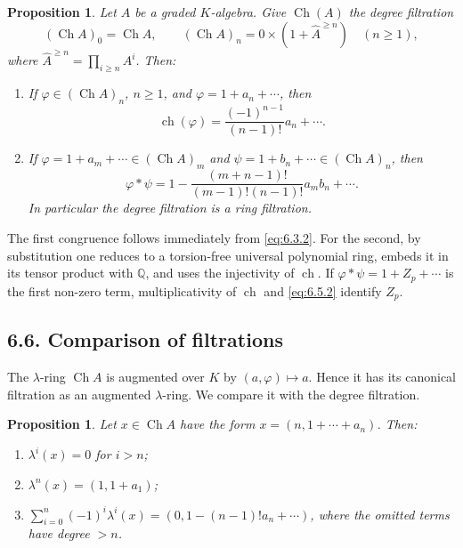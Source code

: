 \documentclass[11pt]{article}
\theoremstyle{plain}
\newtheorem{proposition}[theorem]{Proposition}
\theoremstyle{definition}
\theoremstyle{remark}
\newcommand{\QQ}{\mathbb Q}
\providecommand{\ch}{\operatorname{ch}}
\providecommand{\Ch}{\operatorname{Ch}}
\begin{document}
\begin{proposition}\label{prop:6.5}
Let $A$ be a graded $K$-algebra. Give $\Ch(A)$ the degree filtration
\begin{equation}\label{eq:6.5.1}
(\Ch A)_0=\Ch A,
\qquad
(\Ch A)_n=0\times(1+\widehat A^{\geq n})\quad(n\geq 1),
\end{equation}
where $\widehat A^{\geq n}=\prod_{i\geq n}A^i$. Then:
\begin{enumerate}[label=(\roman*)]
\item If $\varphi\in(\Ch A)_n$, $n\geq 1$, and $\varphi=1+a_n+\cdots$, then
\begin{equation}\label{eq:6.5.2}
\ch(\varphi)=\frac{(-1)^{n-1}}{(n-1)!}a_n+\cdots.
\end{equation}
\item If $\varphi=1+a_m+\cdots\in(\Ch A)_m$ and $\psi=1+b_n+\cdots\in(\Ch A)_n$, then
\begin{equation}\label{eq:6.5.3}
\varphi*\psi=1-\frac{(m+n-1)!}{(m-1)!(n-1)!}a_mb_n+\cdots.
\end{equation}
In particular the degree filtration is a ring filtration.
\end{enumerate}
\end{proposition}

The first congruence follows immediately from \eqref{eq:6.3.2}. For the second, by substitution one reduces to a torsion-free universal polynomial ring, embeds it in its tensor product with $\QQ$, and uses the injectivity of $\ch$. If $\varphi*\psi=1+Z_p+\cdots$ is the first non-zero term, multiplicativity of $\ch$ and \eqref{eq:6.5.2} identify $Z_p$.

\subsection*{6.6. Comparison of filtrations}
The $\lambda$-ring $\Ch A$ is augmented over $K$ by $(a,\varphi)\mapsto a$. Hence it has its canonical filtration as an augmented $\lambda$-ring. We compare it with the degree filtration.

\begin{proposition}\label{prop:6.6.1}
Let $x\in\Ch A$ have the form $x=(n,1+\cdots+a_n)$. Then:
\begin{enumerate}[label=(\roman*)]
\item $\lambda^i(x)=0$ for $i>n$;
\item $\lambda^n(x)=(1,1+a_1)$;
\item $\sum_{i=0}^{n}(-1)^i\lambda^i(x)=(0,1-(n-1)!a_n+\cdots)$, where the omitted terms have degree $>n$.
\end{enumerate}
\end{proposition}
\end{document}
